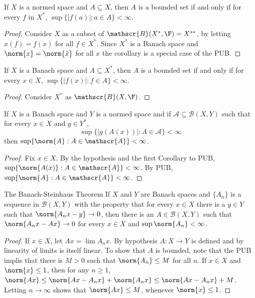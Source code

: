 \begin{cor}
    If $X$ is a normed space and $A \subseteq X$, then $A$ is a bounded set if and only if for every $f$ in $X^*$, $\sup\{|f(a)|:a \in A\} < \infty$.
\end{cor}
\begin{proof}
    Consider $X$ as a subset of $\mathscr{B}(X^*,\F) = X^{**}$, by letting $\hat{x}(f) = f(x)$ for all $f \in X^*$. Since $X^*$ is a Banach space and $\norm{x} = \norm{\hat{x}}$ for all $x$ the corollary is a special case of the PUB.
\end{proof}


\begin{cor}
    If $X$ is a Banach space and $A \subseteq X^*$, then $A$ is a bounded set if and only if for every $x\in X$, $\sup\{|f(x)|:f \in A\} < \infty$.
\end{cor}
\begin{proof}
    Consider $X^*$ as $\mathscr{B}(X,\F)$.
\end{proof}

\begin{cor}
    If $X$ is a Banach space and $Y$ is a normed space and if $\mathscr{A} \subseteq \mathscr{B}(X,Y)$ such that for every $x \in X$ and $g \in Y^*$, $$\sup\{|g(A(x))|:A\in\mathscr{A}\} < \infty$$
    then $\sup\{\norm{A}:A\in\mathscr{A}\} < \infty$.
\end{cor}
\begin{proof}
    Fix $x \in X$. By the hypothesis and the first Corollary to PUB, $\sup\{\norm{A(x)}:A \in \mathscr{A}\} < \infty$. By PUB, $\sup\{\norm{A}:A\in\mathscr{A}\} < \infty$.
\end{proof}

\begin{nthm}{The Banach-Steinhaus Theorem}
    If $X$ and $Y$ are Banach spaces and $\{A_n\}$ is a sequence in $\mathscr{B}(X,Y)$ with the property that for every $x \in X$ there is a $y \in Y$ such that $\norm{A_nx-y}\rightarrow 0$, then there is an $A \in \mathscr{B}(X,Y)$ such that $\norm{A_nx-Ax}\rightarrow 0$ for every $x \in X$ and $\sup\norm{A_n} < \infty$.
\end{nthm}
\begin{proof}
    If $x \in X$, let $Ax = \lim A_nx$. By hypothesis $A:X\rightarrow Y$ is defined and by linearity of limits is itself linear. To show that $A$ is bounded, note that the PUB implis that there is $M > 0$ such that $\norm{A_n} \leq M$ for all $n$. If $x \in X$ and $\norm{x} \leq 1$, then for any $n \geq 1$, $\norm{Ax} \leq \norm{Ax-A_nx}+\norm{A_nx} \leq \norm{Ax-A_nx}+M$. Letting $n\rightarrow \infty$ shows that $\norm{Ax} \leq M$, whenever $\norm{x}\leq 1$.
\end{proof}

